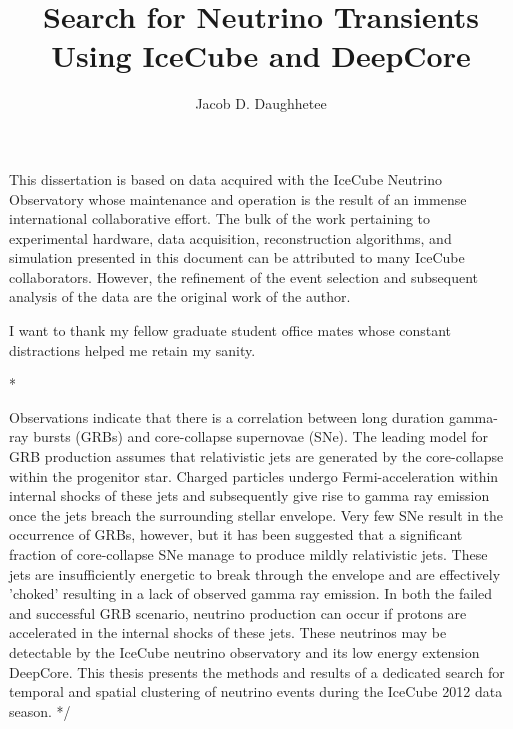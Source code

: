 \documentclass{gatech-thesis}
\title{Search for Neutrino Transients Using IceCube and DeepCore}
\author{Jacob D. Daughhetee}
\begin{document}

\begin{preliminary}
\begin{dedication}
\null\vfil
{\large
\begin{center}

\end{center}}
\vfil\null
\end{dedication}

\begin{preface}
This dissertation is based on data acquired with the IceCube Neutrino Observatory whose maintenance and operation is the result of an immense international collaborative effort. The bulk of the work pertaining to experimental hardware, data acquisition, reconstruction algorithms, and simulation presented in this document can be attributed to many IceCube collaborators. However, the refinement of the event selection and subsequent analysis of the data are the original work of the author.
\end{preface}

\begin{acknowledgements}
I want to thank my fellow graduate student office mates whose constant distractions helped me retain my sanity.
\end{acknowledgements}
\contents

\begin{summary}

\long{}
\/*


Observations indicate that there is a correlation between long duration gamma-ray bursts (GRBs) and core-collapse supernovae (SNe).  The leading model for GRB production assumes that relativistic jets are generated by the core-collapse within the progenitor star.  Charged particles undergo Fermi-acceleration within internal shocks of these jets and subsequently give rise to gamma ray emission once the jets breach the surrounding stellar envelope.  Very few SNe result in the occurrence of GRBs, however,  but it has been suggested that a significant fraction of core-collapse SNe manage to produce mildly relativistic jets.  These jets are insufficiently energetic to break through the envelope and are effectively 'choked' resulting in a lack of observed gamma ray emission.  In both the failed and successful GRB scenario, neutrino production can occur if protons are accelerated in the internal shocks of these jets.  These neutrinos may be detectable by the IceCube neutrino observatory and its low energy extension DeepCore. This thesis presents the methods and results of a dedicated search for temporal and spatial clustering of neutrino events during the IceCube 2012 data season.
*/

\end{summary}

\end{preliminary}
\end{document}
